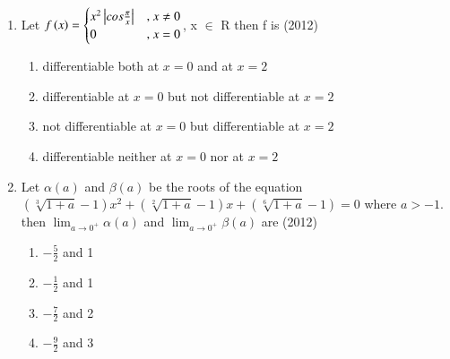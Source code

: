 \documentclass[journal,12pt,twocolumn]{IEEEtran}
\theoremstyle{remark}
\begin{document}
\begin{enumerate}
\item Let $f\left(x\right) =\begin{cases} x^2\left\vert cos \frac{\pi}{x}\right\vert & \text{, } x \neq 0 \\ 0 & \text{, } x = 0 
\end{cases}$, x $\in$ R then f is
\hfill{(2012)} 
\begin{enumerate}[label=\alph*)]
    \item differentiable both at $x=0$ and at $x=2$
    \item differentiable at $x=0$ but not differentiable at $x=2$
    \item not differentiable at $x=0$ but differentiable at $x=2$
    \item differentiable neither at $x=0$ nor at $x=2$ \\
\end{enumerate}
\item 
Let $\alpha(a)$ and $\beta(a)$ be the roots of the equation $(\sqrt[3]{1+a}-1)x^2+(\sqrt[2]{1+a}-1)x+(\sqrt[6]{1+a}-1)=0$ where $a>-1$. then $\lim_{a \to 0^+}{\alpha(a)}$ and $\lim_{a \to 0^+}{\beta(a)}$ are
\hfill{(2012)} 

\begin{enumerate}[label=\alph*)]
    \item $-\frac{5}{2}$ and 1
    \item $-\frac{1}{2}$ and 1
    \item $-\frac{7}{2}$ and 2
    \item $-\frac{9}{2}$ and 3 \\
\end{enumerate}


\end{enumerate}
\end{document}
